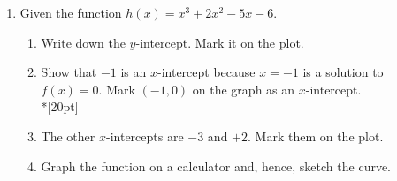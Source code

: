 \documentclass[12pt, twoside]{article}
\begin{document}
\begin{enumerate}
\newpage    
\item Given the function $h(x)=x^3+2x^2-5x-6$.
    \begin{enumerate}
        \item Write down the $y$-intercept. Mark it on the plot.
        \item Show that $-1$ is an $x$-intercept because $x=-1$ is a solution to $f(x)=0$. Mark $(-1, 0)$ on the graph as an $x$-intercept.\\*[20pt]
        \item The other $x$-intercepts are $-3$ and $+2$. Mark them on the plot.
    
    
        \item Graph the function on a calculator and, hence, sketch the curve.
    \end{enumerate}

\end{enumerate}
\end{document}
